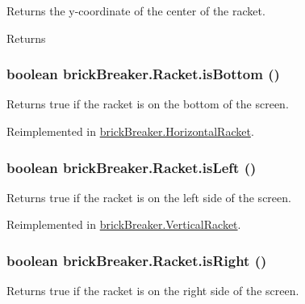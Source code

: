 \label{classbrick_breaker_1_1_racket_a229e48b5cacbc3921f8c626b77489e9b}
Returns the y-\/coordinate of the center of the racket. \begin{DoxyReturn}{Returns}

\end{DoxyReturn}
\hypertarget{classbrick_breaker_1_1_racket_a908f0a42e73739db9fd0734d6a4fdb2f}{
\subsubsection[{isBottom}]{\setlength{\rightskip}{0pt plus 5cm}boolean brickBreaker.Racket.isBottom ()}}
\label{classbrick_breaker_1_1_racket_a908f0a42e73739db9fd0734d6a4fdb2f}
Returns true if the racket is on the bottom of the screen. 

Reimplemented in \hyperlink{classbrick_breaker_1_1_horizontal_racket_aef823257f470172eb2caacfa95a61b99}{brickBreaker.HorizontalRacket}.

\hypertarget{classbrick_breaker_1_1_racket_af8ef3d348dca4cc1daad627826baea56}{
\subsubsection[{isLeft}]{\setlength{\rightskip}{0pt plus 5cm}boolean brickBreaker.Racket.isLeft ()}}
\label{classbrick_breaker_1_1_racket_af8ef3d348dca4cc1daad627826baea56}
Returns true if the racket is on the left side of the screen. 

Reimplemented in \hyperlink{classbrick_breaker_1_1_vertical_racket_aa1af985933bd997bba1951e38107a5a5}{brickBreaker.VerticalRacket}.

\hypertarget{classbrick_breaker_1_1_racket_ad1d76aea1bd7dea3c4114c8c585150ed}{
\subsubsection[{isRight}]{\setlength{\rightskip}{0pt plus 5cm}boolean brickBreaker.Racket.isRight ()}}
\label{classbrick_breaker_1_1_racket_ad1d76aea1bd7dea3c4114c8c585150ed}
Returns true if the racket is on the right side of the screen. 

